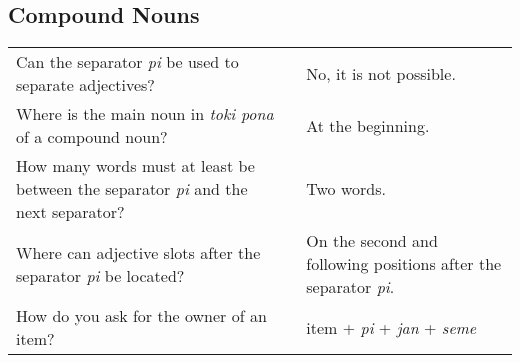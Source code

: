 \newpage
%
\subsection*{Compound Nouns}
\label{'pi'}

\begin{supertabular}{p{5,5cm}|ll}
    Can the separator \textit{pi} be used to separate adjectives?                             &  & No, it is not possible.                                                \\ %
    Where is the main noun in \textit{toki pona} of a compound noun?                          &  & At the beginning.                                                      \\ %
    How many words must at least be between the separator \textit{pi} and the next separator? &  & Two words.                                                             \\ %
    Where can adjective slots after the separator \textit{pi} be located?                     &  & On the second and following positions after the separator \textit{pi}. \\ %
    How do you ask for the owner of an item?                                                  &  & item + \textit{pi} + \textit{jan} + \textit{seme}                      \\ %
\end{supertabular}

